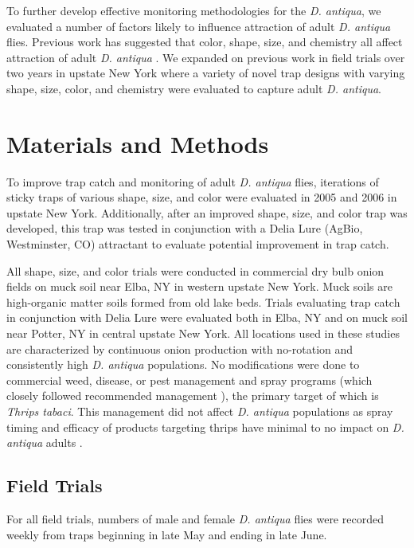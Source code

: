 \documentclass[alpha-refs]{wiley-article}
\begin{document}
To further develop effective monitoring methodologies for the \textit{D. antiqua}, we evaluated a number of factors likely to influence attraction of adult \textit{D. antiqua} flies.  Previous work has suggested that color, shape, size, and chemistry all affect attraction of adult \textit{D. antiqua} \citep{harris1983color,harris1988host, thomingdeveloping, otto2000development}. We expanded on previous work in field trials over two years in upstate New York where a variety of novel trap designs with varying shape, size, color, and chemistry were evaluated to capture adult \textit{D. antiqua}.  

\section{Materials and Methods}

To improve trap catch and monitoring of adult \textit{D. antiqua} flies, iterations of sticky traps of various shape, size, and color were evaluated in 2005 and 2006 in upstate New York.  Additionally, after an improved shape, size, and color trap was developed, this trap was tested in conjunction with a Delia Lure (AgBio, Westminster, CO) attractant to evaluate potential improvement in trap catch.  

All shape, size, and color trials were conducted in commercial dry bulb onion fields on muck soil near Elba, NY in western upstate New York. Muck soils are high-organic matter soils formed from old lake beds.  Trials evaluating trap catch in conjunction with Delia Lure were evaluated both in Elba, NY and on muck soil near Potter, NY in central upstate New York.  All locations used in these studies are characterized by continuous onion production with no-rotation and consistently high \textit{D. antiqua} populations.  No modifications were done to commercial weed, disease, or pest management and spray programs (which closely followed recommended management \citep{reiners2019}), the primary target of which is \textit{Thrips tabaci}. This management did not affect \textit{D. antiqua} populations as spray timing and efficacy of products targeting thrips have minimal to no impact on \textit{D. antiqua} adults \citep{finch1986behavior}. 

\subsection{Field Trials}

For all field trials, numbers of male and female \textit{D. antiqua} flies were recorded weekly from traps beginning in late May and ending in late June. 
\end{document}
